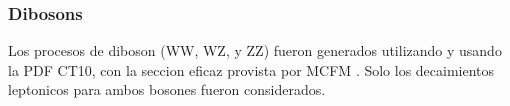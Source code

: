 
\subsubsection{Dibosons}

Los procesos de diboson (WW, WZ, y ZZ) fueron generados utilizando
{\sherpa} y usando la PDF CT10, con la seccion eficaz provista por
MCFM \cite{Campbell:2011bn}. Solo los decaimientos leptonicos para
ambos bosones fueron considerados.

